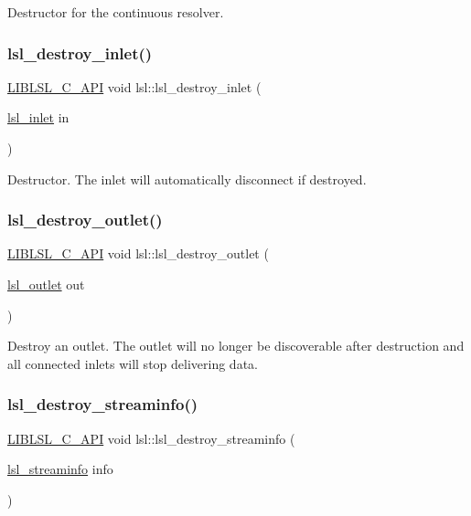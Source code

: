 Destructor for the continuous resolver. \mbox{\label{namespacelsl_a079daffcce73f1ed31bd52d681019029}} 
\subsubsection{\texorpdfstring{lsl\+\_\+destroy\+\_\+inlet()}{lsl\_destroy\_inlet()}}
{\footnotesize\ttfamily \hyperlink{lsl__cpp_8h_aafd0ef1813e8be84a1420c4f1df64615}{L\+I\+B\+L\+S\+L\+\_\+\+C\+\_\+\+A\+PI} void lsl\+::lsl\+\_\+destroy\+\_\+inlet (\begin{DoxyParamCaption}\item[{\hyperlink{namespacelsl_a884a3363cfcba75d7ce8f00c1c4c54f1}{lsl\+\_\+inlet}}]{in }\end{DoxyParamCaption})}

Destructor. The inlet will automatically disconnect if destroyed. \mbox{\label{namespacelsl_aa39980eac53711feece8bfc3b50d2b24}} 
\subsubsection{\texorpdfstring{lsl\+\_\+destroy\+\_\+outlet()}{lsl\_destroy\_outlet()}}
{\footnotesize\ttfamily \hyperlink{lsl__cpp_8h_aafd0ef1813e8be84a1420c4f1df64615}{L\+I\+B\+L\+S\+L\+\_\+\+C\+\_\+\+A\+PI} void lsl\+::lsl\+\_\+destroy\+\_\+outlet (\begin{DoxyParamCaption}\item[{\hyperlink{namespacelsl_abcf512b0f66dacf86c10b165995fd50b}{lsl\+\_\+outlet}}]{out }\end{DoxyParamCaption})}

Destroy an outlet. The outlet will no longer be discoverable after destruction and all connected inlets will stop delivering data. \mbox{\label{namespacelsl_afc7ae71903a0c20763937739fa62df32}} 
\subsubsection{\texorpdfstring{lsl\+\_\+destroy\+\_\+streaminfo()}{lsl\_destroy\_streaminfo()}}
{\footnotesize\ttfamily \hyperlink{lsl__cpp_8h_aafd0ef1813e8be84a1420c4f1df64615}{L\+I\+B\+L\+S\+L\+\_\+\+C\+\_\+\+A\+PI} void lsl\+::lsl\+\_\+destroy\+\_\+streaminfo (\begin{DoxyParamCaption}\item[{\hyperlink{namespacelsl_aa0a9ce9956061679949daa2e35aae2e8}{lsl\+\_\+streaminfo}}]{info }\end{DoxyParamCaption})}

